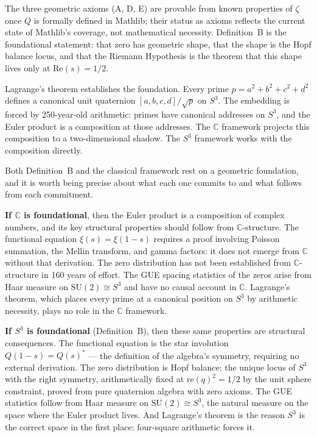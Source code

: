 \documentclass[12pt,a4paper]{article}
\theoremstyle{definition}
\theoremstyle{remark}
\begin{document}
The three geometric axioms (A, D, E) are provable from known properties of
$\zeta$ once $Q$ is formally defined in Mathlib; their status as axioms
reflects the current state of Mathlib's coverage, not mathematical necessity.
Definition~B is the foundational statement: that zero has geometric shape,
that the shape is the Hopf balance locus, and that the Riemann Hypothesis is
the theorem that this shape lives only at $\mathrm{Re}(s) = 1/2$.

Lagrange's theorem establishes the foundation. Every prime $p = a^2+b^2+c^2+d^2$
defines a canonical unit quaternion $[a,b,c,d]/\sqrt{p}$ on $S^3$. The
embedding is forced by 250-year-old arithmetic: primes have canonical
addresses on $S^3$, and the Euler product is a composition at those addresses.
The $\mathbb{C}$ framework projects this composition to a two-dimensional
shadow. The $S^3$ framework works with the composition directly.

Both Definition~B and the classical framework rest on a geometric foundation,
and it is worth being precise about what each one commits to and what follows
from each commitment.

\textbf{If $\mathbb{C}$ is foundational}, then the Euler product is a
composition of complex numbers, and its key structural properties should
follow from $\mathbb{C}$-structure. The functional equation $\xi(s) =
\xi(1-s)$ requires a proof involving Poisson summation, the Mellin transform,
and gamma factors: it does not emerge from $\mathbb{C}$ without that
derivation. The zero distribution has not been established from
$\mathbb{C}$-structure in 160 years of effort. The GUE spacing statistics of
the zeros arise from Haar measure on $\mathrm{SU}(2) \cong S^3$ and have no
causal account in $\mathbb{C}$. Lagrange's theorem, which places every prime
at a canonical position on $S^3$ by arithmetic necessity, plays no role in
the $\mathbb{C}$ framework.

\textbf{If $S^3$ is foundational} (Definition~B), then these same properties
are structural consequences. The functional equation is the star involution
$Q(1-s) = Q(s)^*$ --- the definition of the algebra's symmetry, requiring no
external derivation. The zero distribution is Hopf balance: the unique locus
of $S^3$ with the right symmetry, arithmetically fixed at
$\mathrm{re}(q)^2 = 1/2$ by the unit sphere constraint, proved from pure
quaternion algebra with zero axioms. The GUE statistics follow from Haar
measure on $\mathrm{SU}(2) \cong S^3$, the natural measure on the space where
the Euler product lives. And Lagrange's theorem is the reason $S^3$ is the
correct space in the first place: four-square arithmetic forces it.
\end{document}
